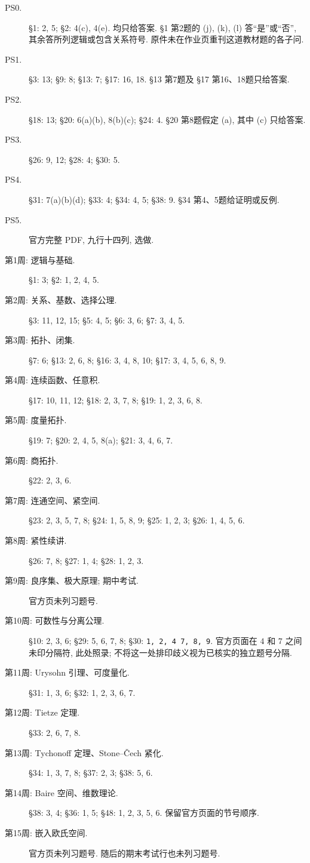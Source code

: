 \begin{description}
\item[PS0.] \S1: 2, 5; \S2: 4(c), 4(e). 均只给答案. \S1 第2题的 (j), (k), (l) 答“是”或“否”, 其余答所列逻辑或包含关系符号. 原件未在作业页重刊这道教材题的各子问.
\item[PS1.] \S3: 13; \S9: 8; \S13: 7; \S17: 16, 18. \S13 第7题及 \S17 第16、18题只给答案.
\item[PS2.] \S18: 13; \S20: 6(a)(b), 8(b)(c); \S24: 4. \S20 第8题假定 (a), 其中 (c) 只给答案.
\item[PS3.] \S26: 9, 12; \S28: 4; \S30: 5.
\item[PS4.] \S31: 7(a)(b)(d); \S33: 4; \S34: 4, 5; \S38: 9. \S34 第4、5题给证明或反例.
\item[PS5.] 官方完整 PDF, 九行十四列, 选做.
\end{description}

\begin{description}
\item[第1周: 逻辑与基础.] \S1: 3; \S2: 1, 2, 4, 5.
\item[第2周: 关系、基数、选择公理.] \S3: 11, 12, 15; \S5: 4, 5; \S6: 3, 6; \S7: 3, 4, 5.
\item[第3周: 拓扑、闭集.] \S7: 6; \S13: 2, 6, 8; \S16: 3, 4, 8, 10; \S17: 3, 4, 5, 6, 8, 9.
\item[第4周: 连续函数、任意积.] \S17: 10, 11, 12; \S18: 2, 3, 7, 8; \S19: 1, 2, 3, 6, 8.
\item[第5周: 度量拓扑.] \S19: 7; \S20: 2, 4, 5, 8(a); \S21: 3, 4, 6, 7.
\item[第6周: 商拓扑.] \S22: 2, 3, 6.
\item[第7周: 连通空间、紧空间.] \S23: 2, 3, 5, 7, 8; \S24: 1, 5, 8, 9; \S25: 1, 2, 3; \S26: 1, 4, 5, 6.
\item[第8周: 紧性续讲.] \S26: 7, 8; \S27: 1, 4; \S28: 1, 2, 3.
\item[第9周: 良序集、极大原理; 期中考试.] 官方页未列习题号.
\item[第10周: 可数性与分离公理.] \S10: 2, 3, 6; \S29: 5, 6, 7, 8; \S30: \texttt{1, 2, 4 7, 8, 9}. 官方页面在 $4$ 和 $7$ 之间未印分隔符, 此处照录; 不将这一处排印歧义视为已核实的独立题号分隔.
\item[第11周: Urysohn 引理、可度量化.] \S31: 1, 3, 6; \S32: 1, 2, 3, 6, 7.
\item[第12周: Tietze 定理.] \S33: 2, 6, 7, 8.
\item[第13周: Tychonoff 定理、Stone--\v{C}ech 紧化.] \S34: 1, 3, 7, 8; \S37: 2, 3; \S38: 5, 6.
\item[第14周: Baire 空间、维数理论.] \S38: 3, 4; \S36: 1, 5; \S48: 1, 2, 3, 5, 6. 保留官方页面的节号顺序.
\item[第15周: 嵌入欧氏空间.] 官方页未列习题号. 随后的期末考试行也未列习题号.
\end{description}

